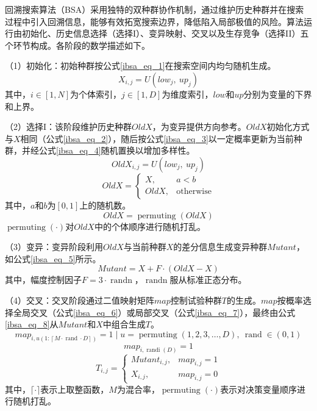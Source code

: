 回溯搜索算法（BSA）采用独特的双种群协作机制，通过维护历史种群并在搜索过程中引入回溯信息，能够有效拓宽搜索边界，降低陷入局部极值的风险。算法运行由初始化、历史信息选择（选择I）、变异映射、交叉以及生存竞争（选择II）五个环节构成。各阶段的数学描述如下。

（1）初始化：初始种群按公式\eqref{ibsa_eq_1}在搜索空间内均匀随机生成。
\begin{equation}
\label{ibsa_eq_1}
X_{i,j}=U(low_j,\ up_j)
\end{equation}
\noindent 其中，$i\in[1,N]$为个体索引，$j\in[1,D]$为维度索引，$low$和$up$分别为变量的下界和上界。

（2）选择I：该阶段维护历史种群$OldX$，为变异提供方向参考。$OldX$初始化方式与$X$相同（公式\eqref{ibsa_eq_2}），随后按公式\eqref{ibsa_eq_3}以一定概率更新为当前种群，并经公式\eqref{ibsa_eq_4}随机置换以增加多样性。
\begin{equation}
\label{ibsa_eq_2}
OldX_{i,j}=U(low_j,\ up_j)
\end{equation}
\begin{equation}
\label{ibsa_eq_3}
OldX=
\begin{cases}
X, & a<b\\
OldX, & \text{otherwise}
\end{cases}
\end{equation}
\noindent 其中，$a$和$b$为$[0,1]$上的随机数。
\begin{equation}
\label{ibsa_eq_4}
OldX=\operatorname{permuting}\left(OldX\right)
\end{equation}
$\operatorname{permuting}(\cdot)$对$OldX$中的个体顺序进行随机打乱。

（3）变异：变异阶段利用$OldX$与当前种群$X$的差分信息生成变异种群$Mutant$，如公式\eqref{ibsa_eq_5}所示。
\begin{equation}
\label{ibsa_eq_5}
Mutant = X + F \cdot \left(OldX - X\right)
\end{equation}
其中，幅度控制因子$F = 3 \cdot \operatorname{randn}$，$\operatorname{randn}$服从标准正态分布。

（4）交叉：交叉阶段通过二值映射矩阵$map$控制试验种群$T$的生成。$map$按概率选择全局交叉（公式\eqref{ibsa_eq_6}）或局部交叉（公式\eqref{ibsa_eq_7}），最终由公式\eqref{ibsa_eq_8}从$Mutant$和$X$中组合生成$T$。
\begin{equation}
\label{ibsa_eq_6}
map_{i,u\left(1:\left\lceil M \cdot \operatorname{rand} \cdot D\right\rceil \right)} = 1 \mid u=\operatorname{permuting}\left(1,2,3,\dots,D\right),\ \operatorname{rand}\in \left(0,1\right)
\end{equation}
\begin{equation}
\label{ibsa_eq_7}
map_{i,\operatorname{randi}\left(D\right)}=1
\end{equation}
\begin{equation}
\label{ibsa_eq_8}
T_{i,j}=
\begin{cases}
Mutant_{i,j}, & map_{i,j}=1\\
X_{i,j}, & map_{i,j}=0
\end{cases}
\end{equation}
其中，$\lceil\cdot\rceil$表示上取整函数，$M$为混合率，$\operatorname{permuting}(\cdot)$表示对决策变量顺序进行随机打乱。

